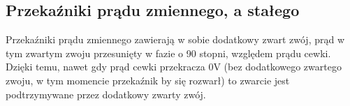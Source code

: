 \documentclass{article}
\begin{document}
\subsection{Przekaźniki prądu zmiennego, a stałego}
Przekaźniki prądu zmiennego zawierają w sobie dodatkowy zwart zwój, prąd w tym zwartym zwoju przesunięty w fazie o 90 stopni,
względem prądu cewki. Dzięki temu, nawet gdy prąd cewki przekracza 0V (bez dodatkowego zwartego zwoju, w tym momencie przekaźnik by się rozwarł)
to zwarcie jest podtrzymywane przez dodatkowy zwarty zwój.
\end{document}
